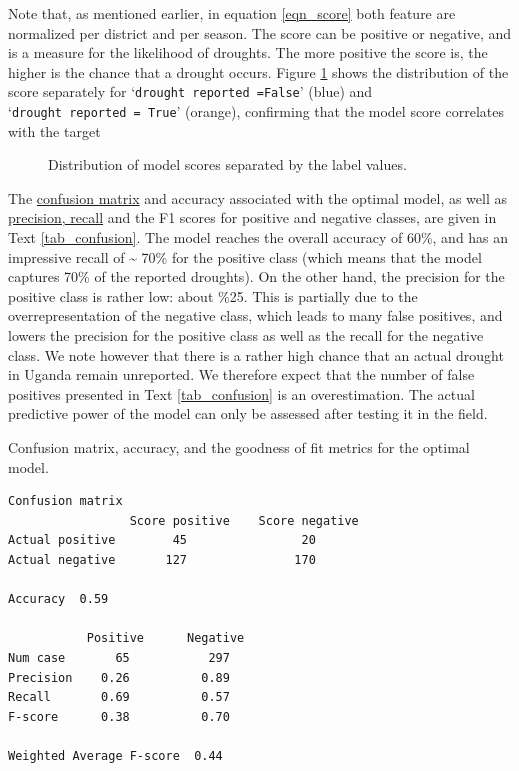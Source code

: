 \documentclass[10pt,parskip=half,
toc=sectionentrywithdots,
bibliography=totocnumbered,
captions=tableheading,numbers=noendperiod]{scrartcl}
\begin{document}
Note that, as mentioned earlier, in equation \ref{eqn_score} both
feature are normalized per district and per season. The score can be
positive or negative, and is a measure for the likelihood of droughts.
The more positive the score is, the higher is the chance that a drought
occurs. Figure \ref{fig_score} shows the distribution of the score
separately for `\texttt{drought\ reported\ =False}' (blue) and
`\texttt{drought\ reported\ =\ True}' (orange), confirming that the
model score correlates with the target

\begin{figure}[H]\begin{center}\end{center}\caption{Distribution of model scores separated by the label values.}\label{fig_score}\end{figure}

The \href{https://en.wikipedia.org/wiki/Confusion_matrix}{confusion
matrix} and accuracy associated with the optimal model, as well as
\href{https://en.wikipedia.org/wiki/Precision_and_recall}{precision,
recall} and the F1 scores for positive and negative classes, are given
in Text \ref{tab_confusion}. The model reaches the overall accuracy of
60\%, and has an impressive recall of \textasciitilde{} 70\% for the
positive class (which means that the model captures 70\% of the reported
droughts). On the other hand, the precision for the positive class is
rather low: about \%25. This is partially due to the overrepresentation
of the negative class, which leads to many false positives, and lowers
the precision for the positive class as well as the recall for the
negative class. We note however that there is a rather high chance that
an actual drought in Uganda remain unreported. We therefore expect that
the number of false positives presented in Text \ref{tab_confusion} is
an overestimation. The actual predictive power of the model can only be
assessed after testing it in the field.

\begin{textcell}[H]
\caption{Confusion matrix, accuracy, and the goodness of fit metrics for the
optimal model.}
\label{tab_confusion}
\begin{lstlisting}[aboveskip=5pt,basicstyle=\small,belowskip=5pt,breakindent=0pt,language={},numbers=none,postbreak={},xrightmargin=7pt]
                 Confusion matrix
                 Score positive    Score negative
Actual positive        45                20
Actual negative       127               170

Accuracy  0.59

           Positive      Negative
Num case       65           297
Precision    0.26          0.89
Recall       0.69          0.57
F-score      0.38          0.70

Weighted Average F-score  0.44

\end{lstlisting}\end{textcell}
\end{document}
